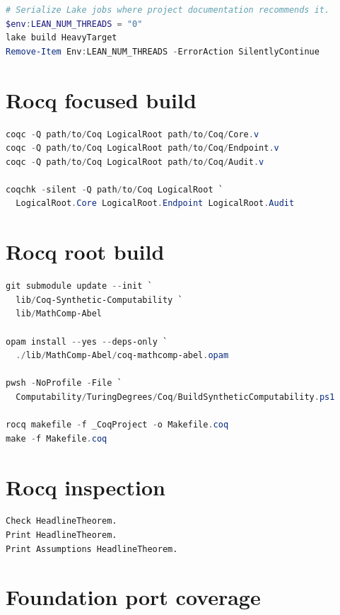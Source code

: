 \documentclass[
  10pt,
  a4paper,
  twoside,
  open=any,
  parskip=half,
  headings=big
]{scrreprt}
\begin{document}
\begin{lstlisting}[language=PowerShell]
# Serialize Lake jobs where project documentation recommends it.
$env:LEAN_NUM_THREADS = "0"
lake build HeavyTarget
Remove-Item Env:LEAN_NUM_THREADS -ErrorAction SilentlyContinue
\end{lstlisting}

\section{Rocq focused build}

\begin{lstlisting}[language=PowerShell]
coqc -Q path/to/Coq LogicalRoot path/to/Coq/Core.v
coqc -Q path/to/Coq LogicalRoot path/to/Coq/Endpoint.v
coqc -Q path/to/Coq LogicalRoot path/to/Coq/Audit.v

coqchk -silent -Q path/to/Coq LogicalRoot `
  LogicalRoot.Core LogicalRoot.Endpoint LogicalRoot.Audit
\end{lstlisting}

\section{Rocq root build}

\begin{lstlisting}[language=PowerShell]
git submodule update --init `
  lib/Coq-Synthetic-Computability `
  lib/MathComp-Abel

opam install --yes --deps-only `
  ./lib/MathComp-Abel/coq-mathcomp-abel.opam

pwsh -NoProfile -File `
  Computability/TuringDegrees/Coq/BuildSyntheticComputability.ps1

rocq makefile -f _CoqProject -o Makefile.coq
make -f Makefile.coq
\end{lstlisting}

\section{Rocq inspection}

\begin{lstlisting}[language=Rocq]
Check HeadlineTheorem.
Print HeadlineTheorem.
Print Assumptions HeadlineTheorem.
\end{lstlisting}

\section{Foundation port coverage}
\end{document}
